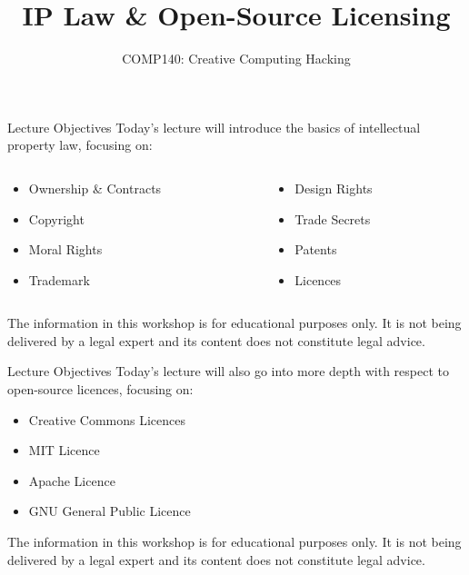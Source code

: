\documentclass[xcolor={dvipsnames}]{beamer}\usepackage{etoolbox}\newtoggle{printable}\togglefalse{printable}
\begin{document}
\title{IP Law \& Open-Source Licensing}   
\subtitle{COMP140: Creative Computing Hacking}

\frame{\titlepage} 

\begin{frame}{Lecture Objectives}
	Today's lecture will introduce the basics of intellectual property law, focusing on:
	
	\vspace{2ex}
	
	\begin{columns}[onlytextwidth]
		\begin{column}{0.5\textwidth}
			\begin{itemize}
				\item Ownership \& Contracts
				\item Copyright
				\item Moral Rights
				\item Trademark
			\end{itemize}
		\end{column}
		\begin{column}{0.5\textwidth}
			\begin{itemize}
				\item Design Rights
				\item Trade Secrets
				\item Patents
				\item Licences
			\end{itemize}
		\end{column}
	\end{columns}
	
	\vspace{3ex}
	
	The information in this workshop is for educational purposes only. It is not being delivered
	by a legal expert and its content does not constitute legal advice.
	
\end{frame}

\begin{frame}{Lecture Objectives}
	Today's lecture will also go into more depth with respect to open-source licences, focusing on:
	
	\vspace{2ex}
	
	\begin{itemize}
		\item Creative Commons Licences
		\item MIT Licence
		\item Apache Licence
		\item GNU General Public Licence
	\end{itemize}
	
	\vspace{2ex}
	
	The information in this workshop is for educational purposes only. It is not being delivered
	by a legal expert and its content does not constitute legal advice.
\end{frame}
\end{document}
